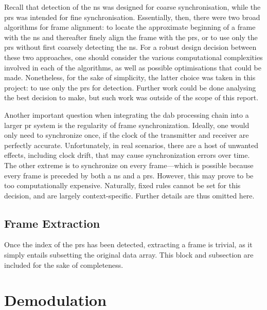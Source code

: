 \documentclass[class=report,11pt,crop=false]{standalone}
\begin{document}
Recall that detection of the \gls{ns} was designed for coarse synchronisation, while the \gls{prs} was intended for fine synchronisation. Essentially, then, there were two broad algorithms for frame alignment: to locate the approximate beginning of a frame with the \gls{ns} and thereafter finely align the frame with the \gls{prs}, or to use only the \gls{prs} without first coarsely detecting the \gls{ns}. For a robust design decision between these two approaches, one should consider the various computational complexities involved in each of the algorithms, as well as possible optimisations that could be made. Nonetheless, for the sake of simplicity, the latter choice was taken in this project: to use only the \gls{prs} for detection. Further work could be done analysing the best decision to make, but such work was outside of the scope of this report.

Another important question when integrating the \gls{dab} processing chain into a larger \gls{pr} system is the regularity of frame synchronization. Ideally, one would only need to synchronize once, if the clock of the transmitter and receiver are perfectly accurate. Unfortunately, in real scenarios, there are a host of unwanted effects, including clock drift, that may cause synchronization errors over time. The other extreme is to synchronize on every frame---which is possible because every frame is preceded by both a \gls{ns} and a \gls{prs}. However, this may prove to be too computationally expensive. Naturally, fixed rules cannot be set for this decision, and are largely context-specific. Further details are thus omitted here.

\subsection{Frame Extraction \label{subsect:dab-proc_frame-extract}}
Once the index of the \gls{prs} has been detected, extracting a frame is trivial, as it simply entails subsetting the original data array. This block and subsection are included for the sake of completeness.

\section{Demodulation \label{sect:dab-proc_demodulate}}
\end{document}
